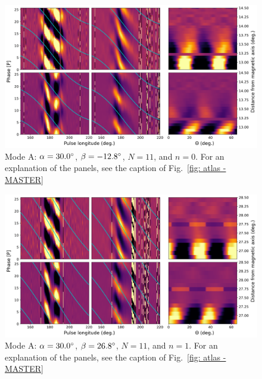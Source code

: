 \begin{figure}
	\begin{center}
		\includegraphics[width=\atlasHeightFrac\textwidth]{Figures/B0031/atlas/A_517030011000_plots}
		\caption[Atlas results: Mode A -- $\alpha=30.0\degr$, $\beta=-12.8\degr$, $N=11$, $n=0$]{Mode A: $\alpha=30.0\degr$, $\beta=-12.8\degr$, $N=11$, and $n=0$. For an explanation of the panels, see the caption of Fig.~\ref{fig: atlas - MASTER} }
		\label{fig: atlas - A_517030011000}
	\end{center}
\end{figure}

\begin{figure}
	\begin{center}
		\includegraphics[width=\atlasHeightFrac\textwidth]{Figures/B0031/atlas/A_517030011001_plots}
		\caption[Atlas results: Mode A -- $\alpha=30.0\degr$, $\beta=26.8\degr$, $N=11$, $n=1$]{Mode A: $\alpha=30.0\degr$, $\beta=26.8\degr$, $N=11$, and $n=1$. For an explanation of the panels, see the caption of Fig.~\ref{fig: atlas - MASTER} }
		\label{fig: atlas - A_517030011001}
	\end{center}
\end{figure}

